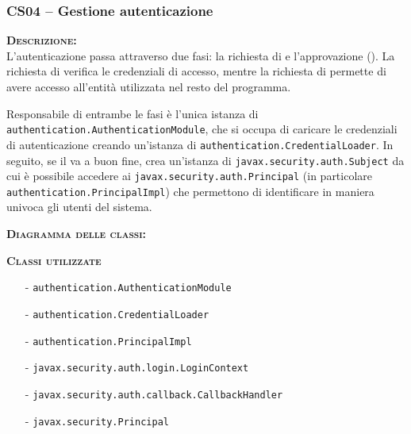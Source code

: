 \subsubsection{CS04 -- Gestione autenticazione}
\begin{description}
  \item{\scshape\bfseries Descrizione:}\\
L'autenticazione passa attraverso due fasi: la richiesta di  e l'approvazione (). La richiesta di  verifica le credenziali di accesso, mentre la richiesta di  permette di avere accesso all'entità utilizzata nel resto del programma.

Responsabile di entrambe le fasi è l'unica istanza di \texttt{authentication.AuthenticationModule}, che si occupa di caricare le credenziali di autenticazione creando un'istanza di \texttt{authentication.CredentialLoader}. In seguito, se il  va a buon fine, crea un'istanza di \texttt{javax.security.auth.Subject} da cui è possibile accedere ai \texttt{javax.security.auth.Principal} (in particolare \texttt{authentication.PrincipalImpl}) che permettono di identificare in maniera univoca gli utenti del sistema.
  
  \item{\scshape\bfseries Diagramma delle classi:}
  
  \item{\scshape\bfseries Classi utilizzate}
  \begin{itemize}
    \item[-] \texttt{authentication.AuthenticationModule}
	  \item[-] \texttt{authentication.CredentialLoader}
	  \item[-] \texttt{authentication.PrincipalImpl}
	  \item[-] \texttt{javax.security.auth.login.LoginContext}
	  \item[-] \texttt{javax.security.auth.callback.CallbackHandler}
	  \item[-] \texttt{javax.security.Principal}
  \end{itemize}

\end{description}

